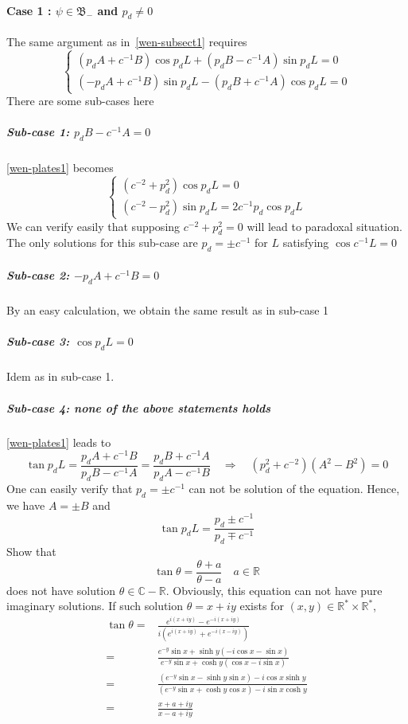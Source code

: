 \paragraph{Case 1 : $\psi \in \mathfrak{B}_-$ and $p_d \neq 0$}
The same argument as in~\cref{wen-subsect1} requires
\begin{equation}\label{wen-plates1}
\begin{cases}
(p_d A + c^{-1} B) \cos p_d L + (p_d B - c^{-1} A)\sin p_d L = 0 \\
(- p_d A + c^{-1}B)\sin p_d L - (p_d B + c^{-1} A)\cos p_d L = 0
\end{cases}
\end{equation}
There are some sub-cases here
\subparagraph{Sub-case 1: $ p_d B - c^{-1}A = 0$}
\cref{wen-plates1} becomes
\begin{equation*}
\begin{cases}
(c^{-2} + p_d ^2)\cos p_d L = 0 \\
(c^{-2} - p_d^2)\sin p_d L = 2 c^{-1}p_d \cos p_d L
\end{cases}
\end{equation*}
We can verify easily that supposing $ c^{-2} + p_d^2 = 0 $ will lead to paradoxal situation. The only solutions for this sub-case are $p_d = \pm c^{-1}$ for $L$ satisfying $\cos c^{-1} L = 0$
%
\subparagraph{Sub-case 2: $ -p_d A + c^{-1}B = 0$}
By an easy calculation, we obtain the same result as in sub-case 1
%
\subparagraph{Sub-case 3: $\cos p_d L = 0 $}
Idem as in sub-case 1.
%
\subparagraph{Sub-case 4: none of the above statements holds}
\cref{wen-plates1} leads to
\begin{equation*}
\tan p_d L = \frac{p_d A + c^{-1} B }{p_d B - c^{-1} A} = 
\frac{p_d B + c^{-1}A}{p_d A- c^{-1} B}
\quad\Rightarrow\quad
(p_d ^2 + c^{-2})(A^2 - B^2 )= 0
\end{equation*}
One can easily verify that $p_d = \pm c^{-1}$ can not be solution of the equation. 
Hence, we have $A = \pm B$ and
\begin{equation}\label{wen-tan}
\tan p_d L = \frac{p_d \pm c^{-1}}{p_d \mp c^{-1}}
\end{equation}
Show that
\begin{equation*}
\tan \theta = \frac{\theta + a}{\theta - a} \quad a\in \mathbb{R} 
\end{equation*}
does not have solution $\theta \in \mathbb{C} - \mathbb{R}$.
Obviously, this equation can not have pure imaginary solutions.
If such solution $\theta = x + i y$ exists for $(x, y) \in\mathbb{R}^*\times\mathbb{R}^*$,
\begin{equation*}
\begin{split}
\tan \theta = & \frac{e^{i(x+iy)} - e^{-i(x+iy)}}{i(e^{i(x+iy)}+ e^{-i(x-iy)})} \\
= & \frac{e^{-y}\sin x + \sinh y (-i\cos x - \sin x)}{e^{-y}\sin x + \cosh y (\cos x - i\sin x)} \\
= & \frac{(e^{-y}\sin x - \sinh y \sin x )- i\cos x \sinh y}{(e^{-y} \sin x +\cosh y \cos x) - i \sin x \cosh y} \\
=& \frac{x+a+ iy}{x -a +iy}
\end{split}
\end{equation*}
